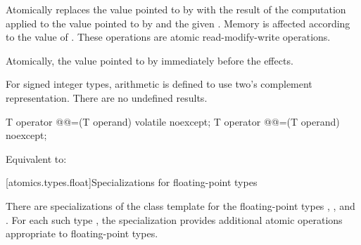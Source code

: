 \begin{itemdescr}
\pnum
\effects Atomically replaces the value pointed to by
 with the result of the computation applied to the
value pointed to by  and the given .
Memory is affected according to the value of .
These operations are atomic read-modify-write operations.

\pnum
\returns Atomically, the value pointed to by  immediately before the effects.

\pnum
{}%
\remarks For signed integer types, arithmetic is defined to use two's complement representation.
There are no undefined results.
\end{itemdescr}

%
%
%
%
%
%
%
\begin{itemdecl}
T operator @@=(T operand) volatile noexcept;
T operator @@=(T operand) noexcept;
\end{itemdecl}

\begin{itemdescr}
\pnum
\effects Equivalent to: 
\end{itemdescr}

[atomics.types.float]{Specializations for floating-point types}

%
\pnum
There are specializations of the 
class template for the floating-point types
,
, and
.
For each such type ,
the specialization 
provides additional atomic operations appropriate to floating-point types.

